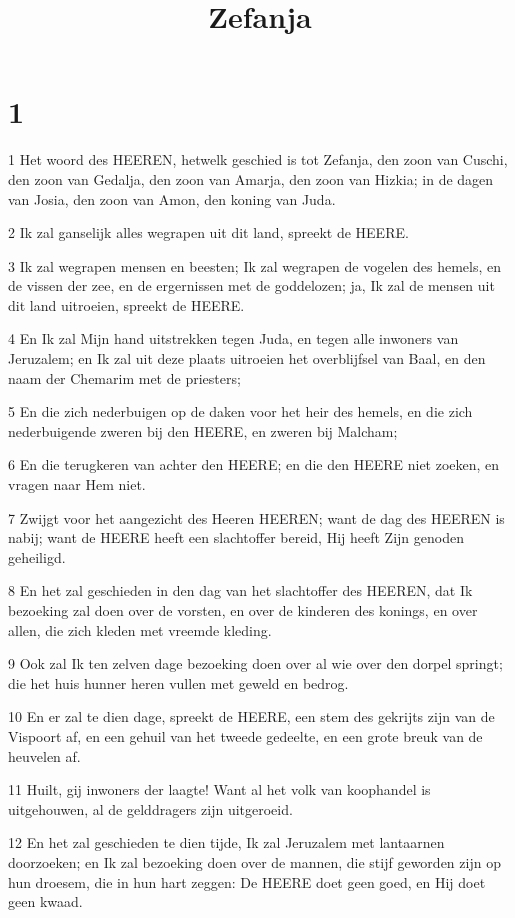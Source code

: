 

\title{Zefanja}



\chapter{1}

\par 1 Het woord des HEEREN, hetwelk geschied is tot Zefanja, den zoon van Cuschi, den zoon van Gedalja, den zoon van Amarja, den zoon van Hizkia; in de dagen van Josia, den zoon van Amon, den koning van Juda.
\par 2 Ik zal ganselijk alles wegrapen uit dit land, spreekt de HEERE.
\par 3 Ik zal wegrapen mensen en beesten; Ik zal wegrapen de vogelen des hemels, en de vissen der zee, en de ergernissen met de goddelozen; ja, Ik zal de mensen uit dit land uitroeien, spreekt de HEERE.
\par 4 En Ik zal Mijn hand uitstrekken tegen Juda, en tegen alle inwoners van Jeruzalem; en Ik zal uit deze plaats uitroeien het overblijfsel van Baal, en den naam der Chemarim met de priesters;
\par 5 En die zich nederbuigen op de daken voor het heir des hemels, en die zich nederbuigende zweren bij den HEERE, en zweren bij Malcham;
\par 6 En die terugkeren van achter den HEERE; en die den HEERE niet zoeken, en vragen naar Hem niet.
\par 7 Zwijgt voor het aangezicht des Heeren HEEREN; want de dag des HEEREN is nabij; want de HEERE heeft een slachtoffer bereid, Hij heeft Zijn genoden geheiligd.
\par 8 En het zal geschieden in den dag van het slachtoffer des HEEREN, dat Ik bezoeking zal doen over de vorsten, en over de kinderen des konings, en over allen, die zich kleden met vreemde kleding.
\par 9 Ook zal Ik ten zelven dage bezoeking doen over al wie over den dorpel springt; die het huis hunner heren vullen met geweld en bedrog.
\par 10 En er zal te dien dage, spreekt de HEERE, een stem des gekrijts zijn van de Vispoort af, en een gehuil van het tweede gedeelte, en een grote breuk van de heuvelen af.
\par 11 Huilt, gij inwoners der laagte! Want al het volk van koophandel is uitgehouwen, al de gelddragers zijn uitgeroeid.
\par 12 En het zal geschieden te dien tijde, Ik zal Jeruzalem met lantaarnen doorzoeken; en Ik zal bezoeking doen over de mannen, die stijf geworden zijn op hun droesem, die in hun hart zeggen: De HEERE doet geen goed, en Hij doet geen kwaad.
